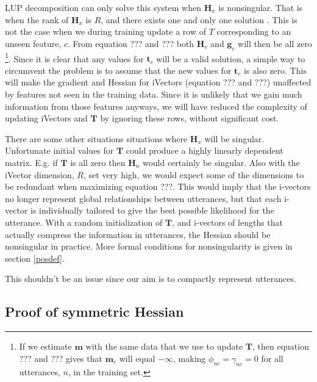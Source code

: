 LUP decomposition can only solve this system when $\mathbf{H}_x$ is nonsingular. That is when the rank of $\mathbf{H}_x$ is $R$, and there exists one and only one solution \cite[p. 54]{matte3}. This is not the case when we during training update a row of $T$ corresponding to an unseen feature, $c$. From equation ??? and ??? both $\mathbf{H}_c$ and $\mathbf{g}_c$ will then be all zero \footnote{If we estimate $\mathbf{m}$ with the same data that we use to update $\mathbf{T}$, then equation ??? and ??? gives that $\mathbf{m}_c$ will equal $-\infty$, making $\phi_{nc}=\gamma_{nc}=0$ for all utterances, $n$, in the training set.}. Since it is clear that any values for $\mathbf{t}_c$ will be a valid solution, a simple way to circumvent the problem is to assume that the new values for $\mathbf{t}_c$ is also zero. This will make the gradient and Hessian for iVectors (equation ??? and ???) unaffected by features not seen in the training data. Since it is unlikely that we gain much information  from those features anyways, we will have reduced the complexity of updating iVectors and $\mathbf{T}$ by ignoring these rows, without significant cost.

There are some other situations situations where $\mathbf{H}_x$ will be singular. Unfortunate initial values for $\mathbf{T}$ could produce a highly linearly dependent matrix. E.g. if $\mathbf{T}$ is all zero then $\mathbf{H}_n$ would certainly be singular. Also with the iVector dimension, $R$, set very high, we would expect some of the dimensions to be redundant when maximizing equation ???. This would imply that the i-vectors no longer represent global relationships between utterances, but that each i-vector is individually tailored to give the best possible likelihood for the utterance. With a random initialization of $\mathbf{T}$, and i-vectors of lengths that actually compress the information in utterances, the Hessian should be nonsingular in practice. More formal conditions for nonsingularity is given in section \ref{posdef}.

This shouldn't be an issue since our aim is to compactly represent utterances. 

\subsection{Proof of symmetric Hessian}

